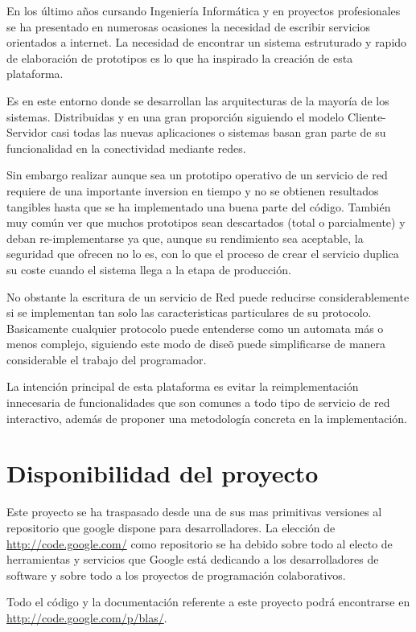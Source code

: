 \documentclass[a4paper,spanish,12pt]{book}
\begin{document}
En los último años cursando Ingeniería Informática y en proyectos profesionales se ha presentado en numerosas ocasiones la necesidad de escribir servicios orientados a internet. La necesidad de encontrar un sistema estruturado y rapido de elaboración de prototipos es lo que ha inspirado la creación de esta plataforma.

Es en este entorno donde se desarrollan las arquitecturas de la mayor\'ia de los sistemas. Distribuidas y en una gran proporci\'on siguiendo el modelo Cliente-Servidor casi todas las nuevas aplicaciones o sistemas basan gran parte de su funcionalidad en la conectividad mediante redes. 

Sin embargo realizar aunque sea un prototipo operativo de un servicio de red requiere de una importante inversion en tiempo y no se obtienen resultados tangibles hasta que se ha implementado una buena parte del código.
Tambi\'en muy com\'un ver que muchos prototipos sean descartados (total o parcialmente) y deban re-implementarse ya que, aunque su rendimiento sea aceptable, la seguridad que ofrecen no lo es, con lo que el proceso de crear el servicio duplica su coste cuando el sistema llega a la etapa de producci\'on.

No obstante la escritura de un servicio de Red puede reducirse considerablemente si se implementan tan solo las caracteristicas particulares de su protocolo. Basicamente cualquier protocolo puede entenderse como un automata m\'as o menos complejo, siguiendo este modo de dise\~{o} puede simplificarse de manera considerable el trabajo del programador.

La intención principal de esta plataforma es evitar la reimplementación innecesaria de funcionalidades que son comunes a todo tipo de servicio de red interactivo, además de proponer una metodología concreta en la implementación.
\section{Disponibilidad del proyecto}
Este proyecto se ha traspasado desde una de sus mas primitivas versiones al repositorio que google dispone para desarrolladores. La elección de \url{http://code.google.com/} como repositorio se ha debido sobre todo al electo de herramientas y servicios que Google está dedicando a los desarrolladores de software y sobre todo a los proyectos de programación colaborativos.

Todo el código y la documentación referente a este proyecto podrá encontrarse en \url{http://code.google.com/p/blas/}.
\end{document}
